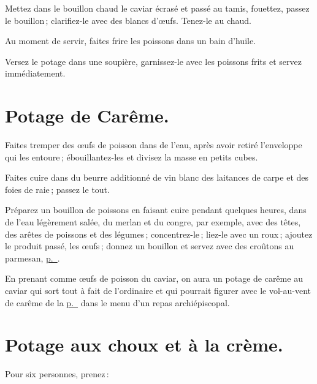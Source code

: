 Mettez dans le bouillon chaud le caviar écrasé et passé au tamis, fouettez,
passez le bouillon ; clarifiez-le avec des blancs d'œufs. Tenez-le au chaud.

Au moment de servir, faites frire les poissons dans un bain d'huile.

Versez le potage dans une soupière, garnissez-le avec les poissons frits et
servez immédiatement.

\section*{\centering Potage de Carême.}

Faites tremper des œufs de poisson dans de l'eau, après avoir retiré
l'enveloppe qui les entoure ; ébouillantez-les et divisez la masse en petits
cubes.

Faites cuire dans du beurre additionné de vin blanc des laitances de carpe et
des foies de raie ; passez le tout.

Préparez un bouillon de poissons en faisant cuire pendant quelques heures, dans
de l’eau légèrement salée, du merlan et du congre, par exemple, avec des têtes,
des arêtes de poissons et des légumes ; concentrez-le ; liez-le avec un roux ;
ajoutez le produit passé, les œufs ; donnez un bouillon et servez avec des
croûtons au parmesan, \hyperlink{p0259}{p. \pageref{pg0259}}.

\sk

En prenant comme œufs de poisson du caviar, on aura un potage de carême au
caviar qui sort tout à fait de l'ordinaire et qui pourrait figurer avec le
vol-au-vent de carême de la \hyperlink{p0319}{p. \pageref{pg0319}} dans le menu
d'un repas archiépiscopal.

\section*{\centering Potage aux choux et à la crème.}

\medskip

Pour six personnes, prenez :

\medskip

